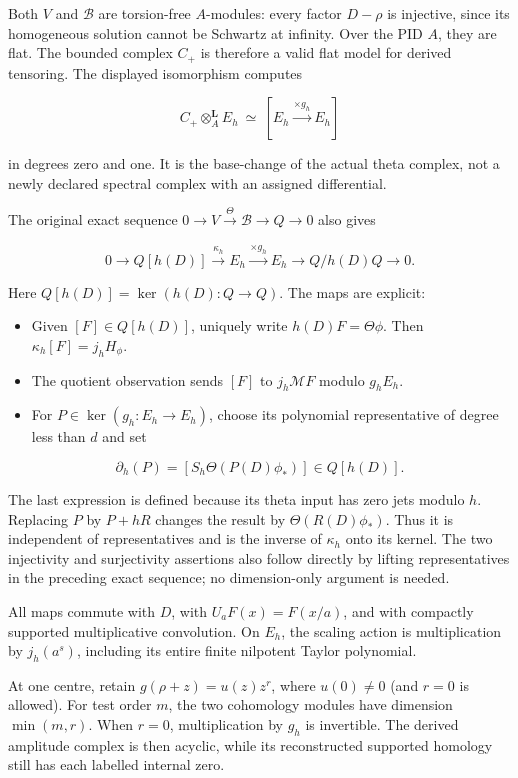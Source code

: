 Both \(V\) and \(\mathscr B\) are torsion-free \(A\)-modules: every factor \(D-\rho\) is injective,
since its homogeneous solution cannot be Schwartz at infinity. Over the PID \(A\), they are flat.
The bounded complex \(C_+\) is therefore a valid flat model for derived tensoring. The displayed
isomorphism computes

\[\boxed{C_+\otimes_A^{\mathbf L}E_h\ \simeq\ [E_h\xrightarrow{\times g_h}E_h]}\]

in degrees zero and one. It is the base-change of the actual theta complex, not a newly declared
spectral complex with an assigned differential.

The original exact sequence \(0\to V\xrightarrow\Theta\mathscr B\to Q\to0\) also gives

\[\boxed{0\to Q[h(D)]\xrightarrow{\kappa_h}E_h
\xrightarrow{\times g_h}E_h\longrightarrow Q/h(D)Q\to0.}\]

Here \(Q[h(D)]=\ker(h(D):Q\to Q)\). The maps are explicit:

\begin{itemize}
\tightlist
\item
  Given \([F]\in Q[h(D)]\), uniquely write \(h(D)F=\Theta\phi\). Then \(\kappa_h[F]=j_hH_\phi\).
\item
  The quotient observation sends \([F]\) to \(j_h\mathcal MF\) modulo \(g_hE_h\).
\item
  For \(P\in\ker(g_h:E_h\to E_h)\), choose its polynomial representative of degree less than \(d\)
  and set
\end{itemize}

\[\boxed{\partial_h(P)=[S_h\Theta(P(D)\phi_*)]\in Q[h(D)].}\]

The last expression is defined because its theta input has zero jets modulo \(h\). Replacing \(P\)
by \(P+hR\) changes the result by \(\Theta(R(D)\phi_*)\). Thus it is independent of representatives
and is the inverse of \(\kappa_h\) onto its kernel. The two injectivity and surjectivity assertions
also follow directly by lifting representatives in the preceding exact sequence; no dimension-only
argument is needed.

All maps commute with \(D\), with \(U_aF(x)=F(x/a)\), and with compactly supported multiplicative
convolution. On \(E_h\), the scaling action is multiplication by \(j_h(a^s)\), including its entire
finite nilpotent Taylor polynomial.

At one centre, retain \(g(\rho+z)=u(z)z^r\), where \(u(0)\ne0\) (and \(r=0\) is allowed). For test
order \(m\), the two cohomology modules have dimension \(\min(m,r)\). When \(r=0\), multiplication
by \(g_h\) is invertible. The derived amplitude complex is then acyclic, while its reconstructed
supported homology still has each labelled internal zero.

